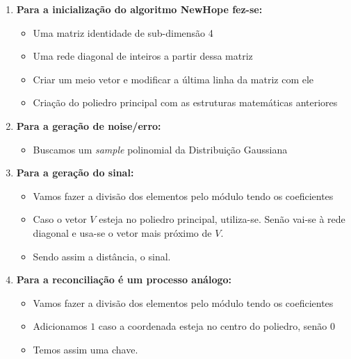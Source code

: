 \documentclass[12pt]{report}
\providecommand{\tightlist}{%
      \setlength{\itemsep}{0pt}\setlength{\parskip}{0pt}}
\begin{document}
\begin{enumerate}
\def\labelenumi{\arabic{enumi}.}
\item
  \textbf{Para a inicialização do algoritmo NewHope fez-se:}

  \begin{itemize}
  \tightlist
  \item
    Uma matriz identidade de sub-dimensão 4
  \item
    Uma rede diagonal de inteiros a partir dessa matriz
  \item
    Criar um meio vetor e modificar a última linha da matriz com ele
  \item
    Criação do poliedro principal com as estruturas matemáticas
    anteriores
  \end{itemize}
\vspace{2mm}

\item
  \textbf{Para a geração de noise/erro:}

  \begin{itemize}
  \tightlist
  \item
    Buscamos um \emph{sample} polinomial da Distribuição Gaussiana
  \end{itemize}
\vspace{2mm}

\item
  \textbf{Para a geração do sinal:}

  \begin{itemize}
  \tightlist
  \item
    Vamos fazer a divisão dos elementos pelo módulo tendo os
    coeficientes
  \item
    Caso o vetor \(V\) esteja no poliedro principal, utiliza-se. Senão
    vai-se à rede diagonal e usa-se o vetor mais próximo de \(V\).
  \item
    Sendo assim a distância, o sinal.
  \end{itemize}
\vspace{2mm}

\item
  \textbf{Para a reconciliação é um processo análogo:}

  \begin{itemize}
  \tightlist
  \item
    Vamos fazer a divisão dos elementos pelo módulo tendo os
    coeficientes
  \item
    Adicionamos \(1\) caso a coordenada esteja no centro do poliedro,
    senão \(0\)
  \item
    Temos assim uma chave.
  \end{itemize}
\end{enumerate}
\end{document}

